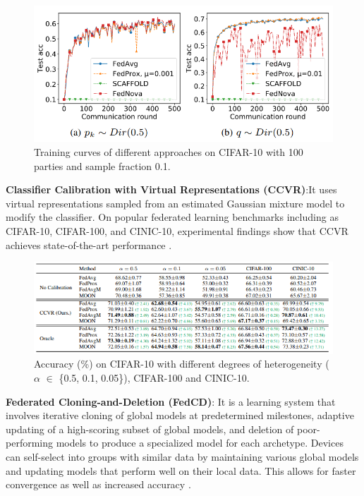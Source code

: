 \begin{figure}[H]
\centering
\includegraphics[scale=0.6]{img/fl19_fedprox.PNG}
\caption{Training curves of different approaches on CIFAR-10 with 100
parties and sample fraction 0.1. \cite{fl19}}
\label{fig:fl19_fedprox}
\end{figure}

\textbf{Classifier Calibration with Virtual Representations (CCVR)}:It uses virtual representations sampled from an estimated Gaussian mixture model to modify the classifier. On popular federated learning benchmarks including as CIFAR-10, CIFAR-100, and CINIC-10, experimental findings show that CCVR achieves state-of-the-art performance \cite{fl20}.

\begin{figure}[H]
\centering
\includegraphics[scale=0.8]{img/fl20_CCVR.PNG}
\caption{Accuracy (\%) on CIFAR-10 with different degrees of heterogeneity ($\alpha$ $\in$ \{0.5, 0.1, 0.05\}), CIFAR-100 and CINIC-10. \cite{fl20}}
\label{fig:fl20_CCVR}
\end{figure}

\textbf{Federated Cloning-and-Deletion (FedCD)}: It is a learning system that involves iterative cloning of global models at predetermined milestones, adaptive updating of a high-scoring subset of global models, and deletion of poor-performing models to produce a specialized model for each archetype. Devices can self-select into groups with similar data by maintaining various global models and updating models that perform well on their local data. This allows for faster convergence as well as increased accuracy \cite{fl21}. 

